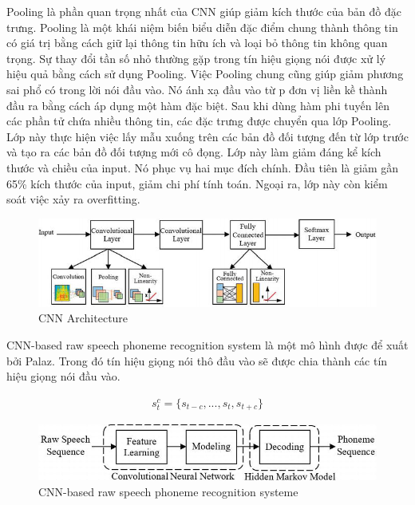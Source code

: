 \documentclass{article}
\begin{document}
	Pooling là phần quan trọng nhất của CNN giúp giảm kích thước của bản đồ đặc trưng. Pooling là một khái niệm biến biểu diễn đặc điểm chung thành thông tin có giá trị bằng cách giữ lại thông tin hữu ích và loại bỏ thông tin không quan trọng. Sự thay đổi tần số nhỏ thường gặp trong tín hiệu giọng nói được xử lý hiệu quả bằng cách sử dụng Pooling. Việc Pooling chung cũng giúp giảm phương sai phổ có trong lời nói đầu vào. Nó ánh xạ đầu vào từ p đơn vị liền kề thành đầu ra bằng cách áp dụng một hàm đặc biệt. Sau khi dùng hàm phi tuyến lên các phần tử chứa nhiều thông tin, các đặc trưng được chuyển qua lớp Pooling. Lớp này thực hiện việc lấy mẫu xuống trên các bản đồ đối tượng đến từ lớp trước và tạo ra các bản đồ đối tượng mới cô đọng. Lớp này làm giảm đáng kể kích thước và chiều của input. Nó phục vụ hai mục đích chính. Đầu tiên là giảm gần 65\% kích thước của input, giảm chi phí tính toán. Ngoại ra, lớp này còn kiểm soát việc xảy ra overfitting.
	
	\begin{figure}[H]
		\centering
		\includegraphics[width=1\linewidth]{images/b3_2.png}
		\caption{CNN Architecture}
		\label{fig:writing-thesis}
	\end{figure} 

	CNN-based raw speech phoneme recognition system là một mô hình được để xuất bởi Palaz. Trong đó tín hiệu giọng nói thô đầu vào sẽ được chia thành các tín hiệu giọng nói đầu vào. 
	
	\begin{gather*}
		s_t^c = \{s_{t-c}, ..., s_t, s_{t+c}\}
	\end{gather*}
	
	\begin{figure}[H]
		\centering
		\includegraphics[width=1\linewidth]{images/b3_3.png}
		\caption{CNN-based raw speech phoneme recognition systeme}
		\label{fig:writing-thesis}
	\end{figure} 
\end{document}
